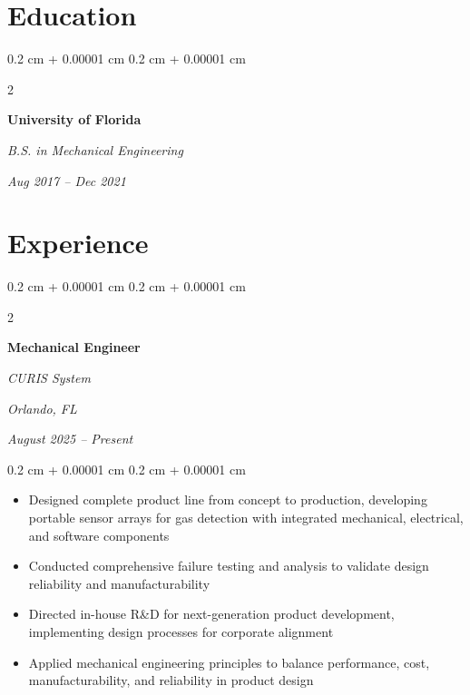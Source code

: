 \documentclass[10pt, letterpaper]{article}
\newenvironment{highlights}{
    \begin{itemize}[
        topsep=0.10 cm,
        parsep=0.10 cm,
        partopsep=0pt,
        itemsep=0pt,
        leftmargin=0.4 cm + 10pt
    ]
}{
    \end{itemize}
} %
\newenvironment{onecolentry}{
    \begin{adjustwidth}{
        0.2 cm + 0.00001 cm
    }{
        0.2 cm + 0.00001 cm
    }
}{
    \end{adjustwidth}
} %
\newenvironment{twocolentry}[2][]{
    \onecolentry
    \def\secondColumn{#2}
    \setcolumnwidth{\fill, 9.0 cm}
    \begin{paracol}{2}
}{
    \switchcolumn \raggedleft \secondColumn
    \end{paracol}
    \endonecolentry
} %
\begin{document}
    \section{Education}

\vspace{0.2 cm}
        
        \begin{twocolentry}{
            
            
        \textit{Aug 2017 – Dec 2021}}
            \textbf{University of Florida}
            
            \textit{B.S. in Mechanical Engineering}
        \end{twocolentry}

        \vspace{0.15 cm}
        

\vspace{0.3 cm}

    
    \section{Experience}

        \vspace{0.2 cm}

        \begin{twocolentry}{
        \textit{Orlando, FL}    
            
        \textit{August 2025 – Present}}
            \textbf{Mechanical Engineer}
            
            \textit{CURIS System}
        \end{twocolentry}

        \vspace{0.10 cm}
        \begin{onecolentry}
            \begin{highlights}
                \item Designed complete product line from concept to production, developing portable sensor arrays for gas detection with integrated mechanical, electrical, and software components
                \item Conducted comprehensive failure testing and analysis to validate design reliability and manufacturability
                \item Directed in-house R\&D for next-generation product development, implementing design processes for corporate alignment
                \item Applied mechanical engineering principles to balance performance, cost, manufacturability, and reliability in product design
            \end{highlights}
        \end{onecolentry}
\end{document}
